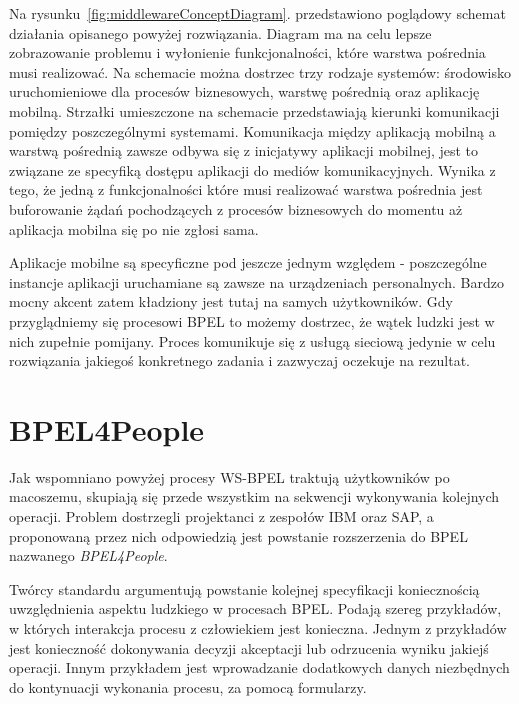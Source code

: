 Na rysunku~\ref{fig:middlewareConceptDiagram}. przedstawiono poglądowy schemat działania opisanego powyżej rozwiązania. Diagram ma na celu lepsze zobrazowanie problemu i wyłonienie funkcjonalności, które warstwa pośrednia musi realizować. Na schemacie można dostrzec trzy rodzaje systemów: środowisko uruchomieniowe dla procesów biznesowych, warstwę pośrednią oraz aplikację mobilną. Strzałki umieszczone na schemacie przedstawiają kierunki komunikacji pomiędzy poszczególnymi systemami.  Komunikacja między aplikacją mobilną a warstwą pośrednią zawsze odbywa się z inicjatywy aplikacji mobilnej, jest to związane ze specyfiką dostępu aplikacji do mediów komunikacyjnych. Wynika z tego, że jedną z funkcjonalności które musi  realizować warstwa pośrednia jest buforowanie żądań pochodzących z procesów biznesowych do momentu aż aplikacja mobilna się po nie zgłosi sama. 

Aplikacje mobilne są specyficzne pod jeszcze jednym względem - poszczególne instancje aplikacji uruchamiane są zawsze na urządzeniach personalnych. Bardzo mocny akcent zatem kładziony jest tutaj na samych użytkowników. Gdy przyglądniemy się procesowi BPEL to możemy dostrzec, że wątek ludzki jest w nich zupełnie pomijany. Proces komunikuje się z usługą sieciową jedynie w celu rozwiązania jakiegoś konkretnego zadania i zazwyczaj oczekuje na rezultat.


\section{BPEL4People}
\label{sec:BPEL4People}

Jak wspomniano powyżej procesy WS-BPEL traktują użytkowników po macoszemu, skupiają się przede wszystkim na sekwencji wykonywania kolejnych operacji. Problem dostrzegli projektanci z zespołów IBM oraz SAP, a proponowaną przez nich odpowiedzią jest powstanie rozszerzenia do BPEL nazwanego \textit{BPEL4People}.  

Twórcy standardu argumentują powstanie kolejnej specyfikacji koniecznością uwzględnienia aspektu ludzkiego w procesach BPEL. Podają szereg przykładów, w których interakcja procesu z człowiekiem jest konieczna. Jednym z przykładów jest konieczność dokonywania decyzji akceptacji lub odrzucenia wyniku jakiejś operacji. Innym przykładem jest wprowadzanie dodatkowych danych niezbędnych do kontynuacji wykonania procesu, za pomocą formularzy. \cite[str. 4]{bpel4People}

